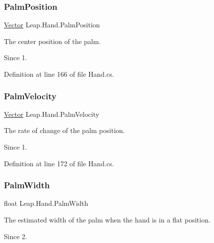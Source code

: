 \subsubsection{\texorpdfstring{PalmPosition}{PalmPosition}}
{\footnotesize\ttfamily \mbox{\hyperlink{struct_leap_1_1_vector}{Vector}} Leap.\+Hand.\+Palm\+Position}



The center position of the palm. 

\begin{DoxySince}{Since}
1. 
\end{DoxySince}


Definition at line 166 of file Hand.\+cs.

\mbox{\label{class_leap_1_1_hand_a61f0daa7259d6c5fe03b9466d4743b43}} 
\subsubsection{\texorpdfstring{PalmVelocity}{PalmVelocity}}
{\footnotesize\ttfamily \mbox{\hyperlink{struct_leap_1_1_vector}{Vector}} Leap.\+Hand.\+Palm\+Velocity}



The rate of change of the palm position. 

\begin{DoxySince}{Since}
1. 
\end{DoxySince}


Definition at line 172 of file Hand.\+cs.

\mbox{\label{class_leap_1_1_hand_a1a8e00fae9b278de950b48ece3a2097e}} 
\subsubsection{\texorpdfstring{PalmWidth}{PalmWidth}}
{\footnotesize\ttfamily float Leap.\+Hand.\+Palm\+Width}



The estimated width of the palm when the hand is in a flat position. 

\begin{DoxySince}{Since}
2. 
\end{DoxySince}


